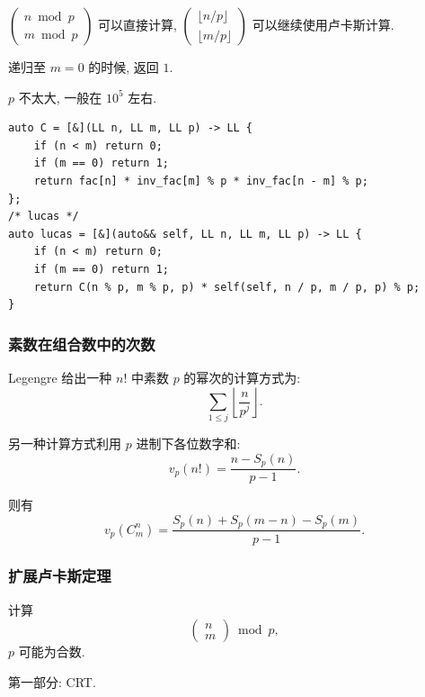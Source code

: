 \documentclass[UTF8, a4paper, titlepage, twoside]{ctexart}
\begin{document}
\(\left( \begin{array}{c} n \bmod p \\ m \bmod p \end{array} \right)\) 可以直接计算,
\(\left( \begin{array}{c} \lfloor n / p \rfloor \\ \lfloor m / p \rfloor \end{array}\right)\) 可以继续使用卢卡斯计算.

递归至 \(m = 0\) 的时候, 返回 \(1\).

\(p\) 不太大, 一般在 \(10^5\) 左右.

\begin{lstlisting}[style=cpp]
auto C = [&](LL n, LL m, LL p) -> LL {
    if (n < m) return 0;
    if (m == 0) return 1;
    return fac[n] * inv_fac[m] % p * inv_fac[n - m] % p;
};
/* lucas */
auto lucas = [&](auto&& self, LL n, LL m, LL p) -> LL {
    if (n < m) return 0;
    if (m == 0) return 1;
    return C(n % p, m % p, p) * self(self, n / p, m / p, p) % p;
}
\end{lstlisting}

\subsubsection*{ 素数在组合数中的次数 }

Legengre 给出一种 $n!$ 中素数 $p$ 的幂次的计算方式为:
\[
    \sum_{1 \leqslant j} \left\lfloor \frac{n}{p^j} \right\rfloor.
\]

另一种计算方式利用 $p$ 进制下各位数字和:
\[
    v_p(n!) = \frac{n - S_p(n)}{p - 1}.
\]

则有
\[
    v_p(C_m^n) = \frac{S_p(n) + S_p(m - n) - S_p(m)}{p - 1}.
\]

\subsubsection*{ 扩展卢卡斯定理 }

计算
\[
    \left( \begin{array}{c} n \\ m \end{array} \right) \bmod p,
\]
\(p\) 可能为合数.

第一部分: CRT.
\end{document}
